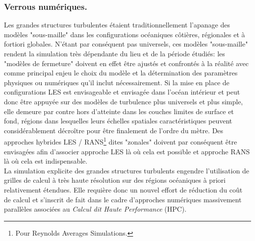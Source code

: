 \subsubsection{Verrous numériques.}
Les grandes structures turbulentes étaient traditionnellement l'apanage des modèles "sous-maille" dans les configurations océaniques côtières, régionales et à fortiori globales. N'étant par conséquent pas universels, ces modèles "sous-maille" rendent la simulation très dépendante du lieu et de la période étudiés: les "modèles de fermeture" doivent en effet être ajustés et confrontés à la réalité avec comme principal enjeu le choix du modèle et la détermination des paramètres physiques ou numériques qu’il inclut nécessairement. Si la mise en place de configurations LES est envisageable et envisagée dans l’océan intérieur et peut donc être appuyée sur des modèles de turbulence plus universels et plus simple, elle demeure par contre hors d’atteinte dans les couches limites de surface et fond, régions dans lesquelles leurs échelles spatiales caractéristiques peuvent considérablement décroître pour être finalement de l'ordre du mètre. Des approches hybrides LES / RANS\footnote{Pour Reynolds Averages Simulations.} dites "zonales" doivent par conséquent être envisagées \citep{friess_modelisation_2010} afin d'associer approche LES là où cela est possible et approche RANS là où cela est indispensable.\\
La simulation explicite des grandes structures turbulents engendre l'utilisation de grilles de calcul à très haute résolution sur des régions océaniques à priori relativement étendues. Elle requière donc un nouvel effort de réduction du coût de calcul et s'inscrit de fait dans le cadre d'approches numériques massivement parallèles associées au \textit{Calcul dit Haute Performance} (HPC).

\color{black}
